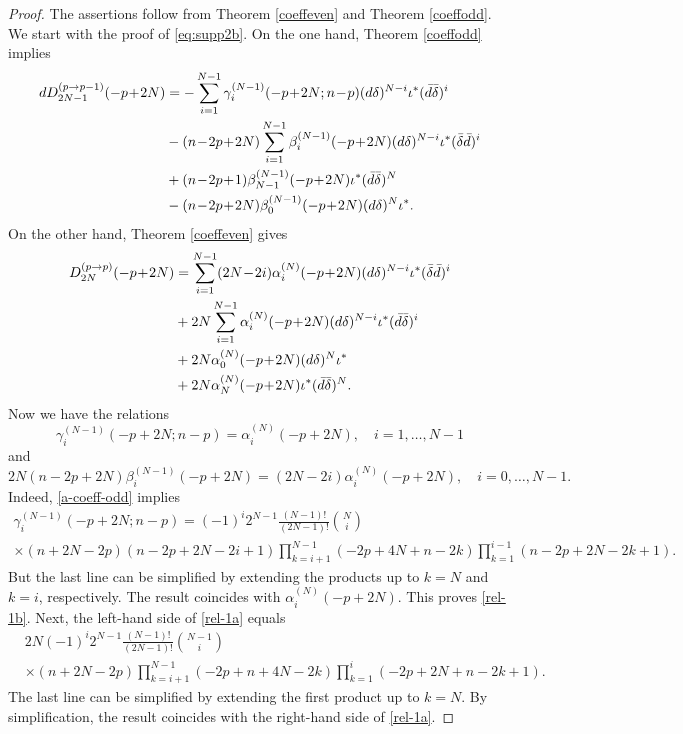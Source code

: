 \documentclass[a4paper,12pt,reqno]{amsart}
\numberwithin{theorem}{subsection}
\numberwithin{equation}{section}
\begin{document}
\begin{proof} The assertions follow from Theorem \ref{coeffeven} and Theorem \ref{coeffodd}.
We start with the proof of \eqref{eq:supp2b}. On the one hand, Theorem
\ref{coeffodd} implies
\begin{align}\label{a-1}
   {d} D_{2N-1}^{(p \to p-1)}(-p\!+\!2N) & = -\sum_{i=1}^{N-1}
   \gamma_i^{(N-1)}(-p\!+\!2N;n\!-\!p) ({d}\delta)^{N-i} \iota^* (\bar{d}\bar{\delta})^i \notag \\
   & - (n\!-\!2p\!+\!2N) \sum_{i=1}^{N-1} \beta_i^{(N-1)}(-p\!+\!2N) ({d}\delta)^{N-i} \iota^*
   (\bar{\delta} \bar{d})^i \notag \\
   & + (n\!-\!2p\!+\!1) \beta_{N-1}^{(N-1)}(-p\!+\!2N) \iota^* (\bar{d}\bar{\delta})^N \notag \\
   & - (n\!-\!2p\!+\!2N) \beta_0^{(N-1)}(-p\!+\!2N) ({d}\delta)^N \iota^*.
\end{align}
On the other hand, Theorem \ref{coeffeven} gives
\begin{align}\label{a-2}
   D_{2N}^{(p \to p)}(-p\!+\!2N) & = \sum_{i=1}^{N-1} (2N\!-\!2i) \alpha_i^{(N)}(-p\!+\!2N)
   ({d}\delta)^{N-i} \iota^* (\bar{\delta} \bar{d})^i \notag \\
   & + 2N \sum_{i=1}^{N-1} \alpha_i^{(N)}(-p\!+\!2N) ({d}\delta)^{N-i} \iota^*
   (\bar{d}\bar{\delta})^i \notag \\
   & + 2N \alpha_0^{(N)}(-p\!+\!2N) ({d}\delta)^{N} \iota^* \notag \\
   & + 2N \alpha_N^{(N)}(-p\!+\!2N) \iota^* (\bar{d}\bar{\delta})^N.
\end{align}
Now we have the relations
\begin{equation}\label{rel-1b}
   \gamma_i^{(N-1)}(-p\!+\!2N;n\!-\!p) = \alpha_i^{(N)}(-p\!+\!2N), \quad i=1,\dots,N-1
\end{equation}
and
\begin{equation}\label{rel-1a}
   2N (n\!-\!2p\!+\!2N) \beta_i^{(N-1)}(-p\!+\!2N) = (2N\!-\!2i) \alpha_i^{(N)}(-p\!+\!2N), \quad
i=0,\dots,N-1.
\end{equation}
Indeed, \eqref{a-coeff-odd} implies
\begin{multline*}
   \gamma_i^{(N-1)}(-p\!+\!2N;n\!-\!p) = (-1)^i 2^{N-1} \frac{(N\!-\!1)! }{(2N\!-\!1)!} \binom{N}{i} \\
   \times (n\!+\!2N\!-\!2p)(n\!-\!2p\!+\!2N\!-\!2i\!+\!1)
   \prod_{k=i+1}^{N-1} (-2p\!+\!4N\!+\!n\!-\!2k) \prod_{k=1}^{i-1} (n\!-\!2p\!+\!2N\!-\!2k\!+\!1).
\end{multline*}
But the last line can be simplified by extending the products up to $k=N$ and
$k=i$, respectively. The result coincides with $\alpha_i^{(N)}(-p\!+\!2N)$.
This proves \eqref{rel-1b}. Next, the left-hand side of \eqref{rel-1a} equals
\begin{align*}
   & 2N (-1)^i 2^{N-1} \frac{(N\!-\!1)!}{(2N\!-\!1)!} \binom{N-1}{i} \\ &
   \times (n\!+\!2N\!-\!2p) \prod_{k=i+1}^{N-1} (-2p\!+\!n\!+\!4N\!-\!2k)
   \prod_{k=1}^i (-2p\!+\!2N\!+n\!-\!2k\!+\!1).
\end{align*}
The last line can be simplified by extending the first product up to $k=N$. By
simplification, the result coincides with the right-hand side of
\eqref{rel-1a}.


\end{proof}
\end{document}

